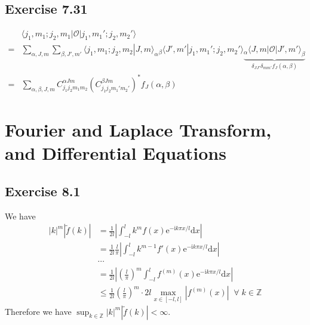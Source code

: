 \documentclass[]{ctexart}
\begin{document}
\subsection{Exercise 7.31}
\begin{align*}
&\langle j_1,m_1;j_2,m_1|\mathcal O|j_1,m_1';j_2,m_2'\rangle\\
={}&\sum_{\alpha,J,m}\sum_{\beta,J',m'}\langle j_1,m_1;j_2,m_2|J,m\rangle_\alpha{}_\beta\!\langle J',m'|j_1,m_1';j_2,m_2'\rangle\underbrace{{}_{\alpha}\!\langle J,m|\mathcal{O}|J',m'\rangle_\beta}_{\delta_{JJ'}\delta_{mm'}f_J(\alpha,\beta)}\\
={}&\sum_{\alpha,\beta,J,m}C_{j_1j_2m_1m_2}^{\alpha Jm}(C_{j_1j_2m_1'm_2'}^{\beta Jm})^*f_J(\alpha,\beta)
\end{align*}

\section{Fourier and Laplace Transform, and Differential Equations}
\subsection{Exercise 8.1}
We have 
\begin{align*}
|k|^m|\tilde{f}(k)|&=\frac{1}{2l}\left|\int_{-l}^lk^mf(x)\mathrm{e}^{-\mathrm{i}k\pi x/l}\mathrm{d}x\right|\\
&=\frac{1}{2l}\frac{l}{\pi}\left|\int_{-l}^l k^{m-1}f'(x)\mathrm{e}^{-\mathrm{i}k\pi x/l}\mathrm{d}x\right|\\
&\cdots \\
&=\frac{1}{2l}\left|\left(\frac{l}{\pi}\right)^m\int_{-l}^{l}f^{(m)}(x)\mathrm{e}^{-\mathrm{i}k\pi x/l}\mathrm{d}x\right|\\
&\le\frac{1}{2l}\left(\frac{l}{\pi}\right)^m\cdot 2l\max_{x\in[-l,l]}|f^{(m)}(x)|\;\;\forall\;k\in\mathbb Z
\end{align*}
Therefore we have $\sup_{k\in\mathbb Z}|k|^m|\tilde{f}(k)|<\infty$. 
\end{document}
